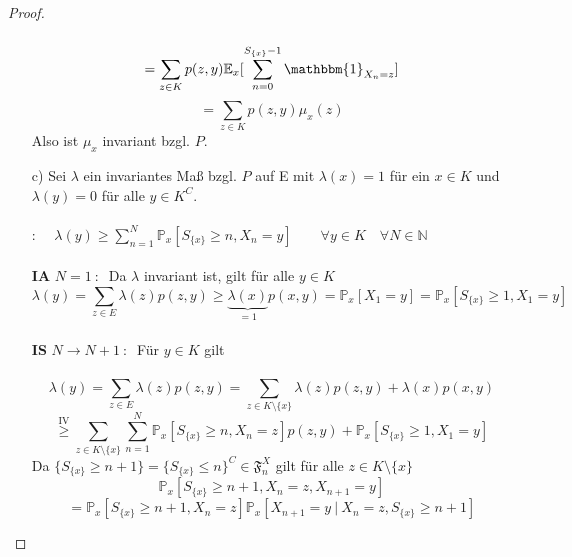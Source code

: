 \documentclass[a4paper,12pt]{scrartcl}
\theoremstyle{definition}
\begin{document}
\begin{proof}
\begin{itemize}
\begin{equation*}
\end{equation*}
\begin{equation*}
= \sum_{z \in K} p(z,y)\mathbb{E}_{x}[\sum_{n=0}^{S_{\lbrace x \rbrace}-1}  \mathbbm{1}_{X_{n} = z}]
\end{equation*}
\begin{equation*}
= \sum_{z \in K} p(z,y) \mu_{x}(z)
\end{equation*}
Also ist $\mu_{x}$ invariant bzgl. $P$.
\item[c)] Sei $\lambda$ ein invariantes Maß bzgl. $P$ auf E mit $\lambda(x) = 1$ für ein $x \in K$ und $\lambda(y) = 0$ für alle $y \in K^{C}$.
\\
\\
: $\quad \lambda(y) \geq \sum_{n=1}^{N} \mathbb{P}_{x}[S_{\lbrace x \rbrace} \geq n, X_{n} = y] \qquad \forall y \in K \quad \forall N \in \mathbb{N}$
\\
\\
\textbf{IA} $N=1 \: : \: $ Da $\lambda$ invariant ist, gilt für alle $y \in K$
\begin{equation*}
\lambda(y) = \sum_{z \in E} \lambda(z)p(z,y) \geq \underbrace{\lambda(x)}_{=1}p(x,y) = \mathbb{P}_{x}[X_{1}=y] = \mathbb{P}_{x}[S_{\lbrace x \rbrace} \geq 1, X_{1} = y]
\end{equation*}
\\
\textbf{IS} $N \to N+1 \: : \: $ Für $y \in K$ gilt
\\
\\
\begin{equation*}
\lambda(y) = \sum_{z \in E} \lambda(z)p(z,y) = \sum_{z \in K \setminus \lbrace x \rbrace} \lambda(z)p(z,y) + \lambda(x)p(x,y)
\end{equation*}
\begin{equation*}
\stackrel{\mathrm{IV}}{\geq} \sum_{z \in K \setminus \lbrace x \rbrace} \sum_{n=1}^{N} \mathbb{P}_{x}[S_{\lbrace x \rbrace} \geq n, X_{n} = z]p(z,y) + \mathbb{P}_{x}[S_{\lbrace x \rbrace} \geq 1, X_{1} = y]
\end{equation*}
Da $\lbrace S_{\lbrace x \rbrace} \geq n + 1 \rbrace = {\lbrace S_{\lbrace x \rbrace} \leq n \rbrace}^{C} \in \mathfrak{F}^{X}_{n} $ gilt für alle $z \in K \setminus \lbrace x \rbrace$ 
\begin{equation*}
\mathbb{P}_{x}[S_{\lbrace x \rbrace} \geq n+1, X_{n} = z, X_{n+1} = y]
\end{equation*}
\begin{equation*}
= \mathbb{P}_{x}[S_{\lbrace x \rbrace} \geq n+1, X_{n} = z] \mathbb{P}_{x}[ X_{n+1} = y \: | \: X_{n} = z, S_{\lbrace x \rbrace} \geq n+1]

\end{equation*}
\end{itemize}
\end{proof}
\end{document}
